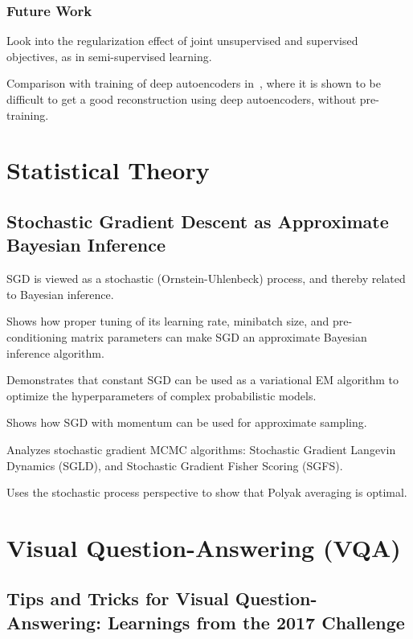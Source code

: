 \documentclass[a4paper, 12pt]{article}
\begin{document}
\subsubsection{Future Work}

Look into the regularization effect of joint unsupervised and supervised
objectives, as in semi-supervised learning.

Comparison with training of deep autoencoders in~\citet{HinSal06}, where it is
shown to be difficult to get a good reconstruction using deep autoencoders,
without pre-training.


\section{Statistical Theory}

\subsection{Stochastic Gradient Descent as Approximate Bayesian
            Inference~\citet{mandt-sgd-2017}}

SGD is viewed as a stochastic (Ornstein-Uhlenbeck) process, and thereby related
to Bayesian inference.

Shows how proper tuning of its learning rate, minibatch size, and
pre-conditioning matrix parameters can make SGD an approximate Bayesian
inference algorithm.

Demonstrates that constant SGD can be used as a variational EM algorithm to
optimize the hyperparameters of complex probabilistic models.

Shows how SGD with momentum can be used for approximate sampling.

Analyzes stochastic gradient MCMC algorithms: Stochastic Gradient Langevin
Dynamics (SGLD), and Stochastic Gradient Fisher Scoring (SGFS).

Uses the stochastic process perspective to show that Polyak averaging is
optimal.


\section{Visual Question-Answering (VQA)}

\subsection{Tips and Tricks for Visual Question-Answering: Learnings from the
            2017 Challenge}
\end{document}
